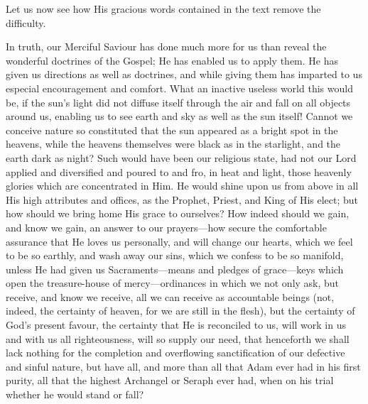 Let us now see how His gracious words contained in the text remove
the difficulty.

In truth, our Merciful Saviour has done much more for us than
reveal the wonderful doctrines of the Gospel; He has enabled us to
apply them. He has given us directions as well as doctrines, and while
giving them has imparted to us especial encouragement and comfort.
What an inactive useless world this would be, if the sun's light did
not diffuse itself through the air and fall on all objects around us,
enabling us to see earth and sky as well as the sun itself! Cannot we
conceive nature so constituted that the sun appeared as a bright spot
in the heavens, while the heavens themselves were black as in the
starlight, and the earth dark as night? Such would have been our
religious state, had not our Lord applied and diversified and poured
to and fro, in heat and light, those heavenly glories which are
concentrated in Him. He would shine upon us from above in all His high
attributes and offices, as the Prophet, Priest, and King of His elect;
but how should we bring home His grace to ourselves? How indeed should
we gain, and know we gain, an answer to our prayers—how secure the
comfortable assurance that He loves us personally, and will change our
hearts, which we feel to be so earthly, and wash away our sins, which
we confess to be so manifold, unless He had given us Sacraments—means
and pledges of grace—keys which open the treasure-house of mercy—ordinances
in which we not only ask, but receive, and know we receive, all we can
receive as accountable beings (not, indeed, the certainty of heaven,
for we are still in the flesh), but the certainty of God's present
favour, the certainty that He is reconciled to us, will work in us and
with us all righteousness, will so supply our need, that henceforth we
shall lack nothing for the completion and overflowing sanctification
of our defective and sinful nature, but have all, and more than all
that Adam ever had in his first purity, all that the highest Archangel
or Seraph ever had, when on his trial whether he would stand or fall?

